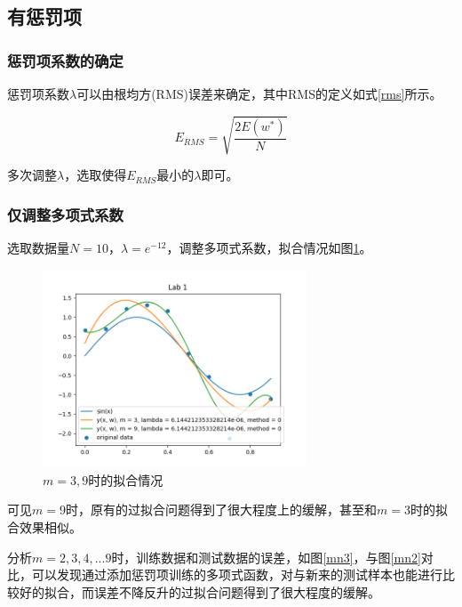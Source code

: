 \subsection{有惩罚项}

\subsubsection{惩罚项系数的确定}

惩罚项系数$\lambda$可以由根均方(RMS)误差\cite{ref3}来确定，其中RMS的定义如式\eqref{rms}所示。

\begin{equation}
    E_{RMS} = \sqrt{\dfrac{2E(w^*)}{N}}
    \label{rms}
\end{equation}

多次调整$\lambda$，选取使得$E_{RMS}$最小的$\lambda$即可。

\subsubsection{仅调整多项式系数}

选取数据量$N = 10$，$\lambda = e^{-12}$，调整多项式系数，拟合情况如图\ref{m39}。

\begin{figure}[htbp]
    \centering
    \includegraphics[width=0.7\textwidth]{figures/Figure_9.png}
    \caption{$m = 3, 9$时的拟合情况}
    \label{m39}
\end{figure}

可见$m = 9$时，原有的过拟合问题得到了很大程度上的缓解，甚至和$m = 3$时的拟合效果相似。

分析$m = 2, 3, 4, ... 9$时，训练数据和测试数据的误差，如图\ref{mn3}，与图\ref{mn2}对比，可以发现通过添加惩罚项训练的多项式函数，对与新来的测试样本也能进行比较好的拟合，而误差不降反升的过拟合问题得到了很大程度的缓解。

